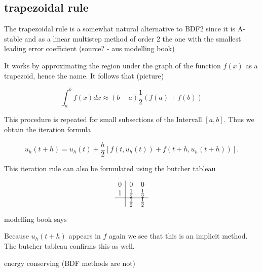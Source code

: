 	
	
	\subsection{trapezoidal rule}
	
	The trapezoidal rule is a somewhat natural alternative to BDF2 since it is A-stable and as a linear multistep method of order 2 the one with the smallest leading error coefficient (source? - aus modelling book)
	
	It works by approximating the region under the graph of the function $f(x)$ as a trapezoid, hence the name. It follows that (picture)
	
	\begin{displaymath}
		\int_{a}^{b} f(x) dx \approx (b-a)\frac{1}{2} (f(a)+f(b))
	\end{displaymath}

	This procedure is repeated for small subsections of the Intervall $[a,b]$. Thus we obtain the iteration formula
	
	\begin{displaymath}
		u_h (t+h) = u_h(t) +\frac{h}{2}[f(t,u_h(t)) + f(t+h, u_h(t+h))].
	\end{displaymath}

	This iteration rule can also be formulated using the butcher tableau
	
	
	
	\begin{displaymath}
		\begin{array}{c|cc}
			0 & 0 & 0 \\
			1 & \frac{1}{2} & \frac{1}{2} \\
			\hline
			& \frac{1}{2} & \frac{1}{2}
		\end{array}
	\end{displaymath}
	
	modelling book says
	
	Because $u_h(t+h)$ appears in $f$ again we see that this is an implicit method. The butcher tableau confirms this as well.
	
	energy conserving (BDF methods are not)

		
		
	
	
	